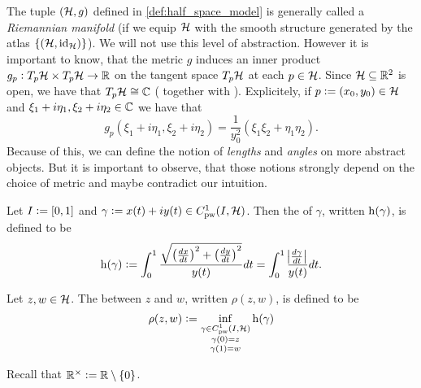 \begin{remark}
	The tuple $(\mathcal{H},g)$ defined in \ref{def:half_space_model} is generally called a \emph{Riemannian manifold} (if we equip $\mathcal{H}$ with the smooth structure generated by the atlas $\cbr[0]{(\Hcal,\id_\Hcal)}$). We will not use this level of abstraction. However it is important to know, that the metric $g$ induces an inner product $g_p: T_p\mathcal{H} \times T_p\mathcal{H} \to \mathbb{R}$ on the tangent space $T_p\mathcal{H}$ at each $p \in \mathcal{H}$. Since $\mathcal{H} \subseteq \mathbb{R}^2$ is open, we have that $T_p\mathcal{H} \cong \mathbb{C}$ (\cite[56]{lee:smooth_manifolds:2013} together with \cite[53]{lee:smooth_manifolds:2013}). Explicitely, if $p := (x_0,y_0) \in \mathcal{H}$ and $\xi_1 + i\eta_1,\xi_2 + i\eta_2 \in \mathbb{C}$ we have that
	\begin{equation}
		g_p(\xi_1 + i\eta_1, \xi_2 + i\eta_2) = \frac{1}{y_0^2}(\xi_1\xi_2 + \eta_1\eta_2).
	\end{equation}
	Because of this, we can define the notion of \emph{lengths} and \emph{angles} on more abstract objects. But it is important to observe, that those notions strongly depend on the choice of metric and maybe contradict our intuition. 
\end{remark}

\begin{definition}
	Let $I := \intcc{0,1}$ and $\gamma := x(t) + iy(t) \in C^1_{\mathrm{pw}}(I,\mathcal{H})$. Then the  of $\gamma$, written $\operatorname{h}(\gamma)$, is defined to be
	\begin{equation}
		\h(\gamma) := \int_0^1 \frac{\sqrt{\del[1]{\frac{dx}{dt}}^2 + \del[1]{\frac{dy}{dt}}^2}}{y(t)} dt = \int_0^1 \frac{\abs[1]{\frac{d\gamma}{dt}}}{y(t)}dt.
	\end{equation}
\end{definition}

\begin{definition}
	Let $z,w \in \mathcal{H}$. The  between $z$ and $w$, written $\rho(z,w)$, is defined to be
	\begin{equation}
		\rho(z,w) := \inf_{\substack{\gamma \in C^1_{\mathrm{pw}}(I,\mathcal{H})\\ \gamma(0) = z\\ \gamma(1) = w}} \operatorname{h}(\gamma)
	\end{equation}
\end{definition}

Recall that $\Rbb^\times := \Rbb \setminus \cbr[0]{0}$.

